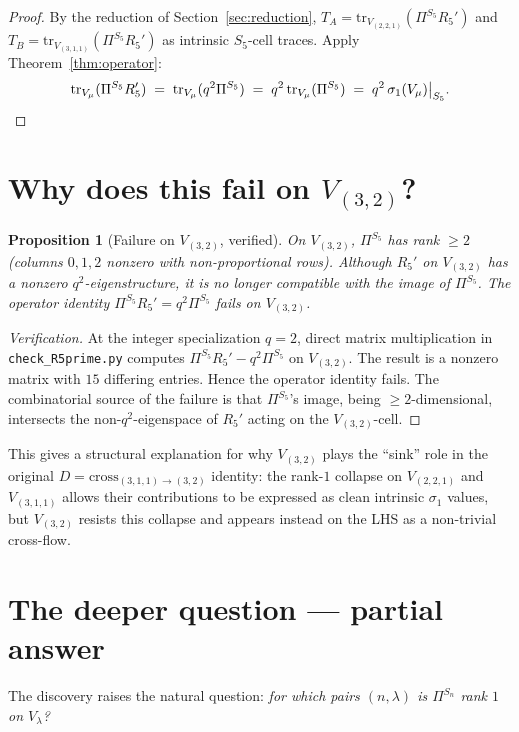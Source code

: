 \documentclass[11pt]{article}
\newtheorem{proposition}[theorem]{Proposition}
\theoremstyle{definition}
\begin{document}
\begin{proof}
By the reduction of Section~\ref{sec:reduction}, $T_A = \mathrm{tr}_{V_{(2,2,1)}}(\Pi^{S_5} R_5')$ and $T_B = \mathrm{tr}_{V_{(3,1,1)}}(\Pi^{S_5} R_5')$ as intrinsic $S_5$-cell traces. Apply Theorem~\ref{thm:operator}:
\[
\mathrm{tr}_{V_\mu}(\Pi^{S_5} R_5') \;=\; \mathrm{tr}_{V_\mu}(q^2 \Pi^{S_5}) \;=\; q^2\, \mathrm{tr}_{V_\mu}(\Pi^{S_5}) \;=\; q^2\, \sigma_1(V_\mu)\big|_{S_5}. \qedhere
\]
\end{proof}

\section{Why does this fail on $V_{(3,2)}$?}\label{sec:32-fail}

\begin{proposition}[Failure on $V_{(3,2)}$, verified]\label{prop:32-fail}
On $V_{(3,2)}$, $\Pi^{S_5}$ has rank $\geq 2$ (columns $0,1,2$ nonzero with non-proportional rows). Although $R_5'$ on $V_{(3,2)}$ has a nonzero $q^2$-eigenstructure, it is no longer compatible with the image of $\Pi^{S_5}$. The operator identity $\Pi^{S_5} R_5' = q^2 \Pi^{S_5}$ fails on $V_{(3,2)}$.
\end{proposition}

\begin{proof}[Verification]
At the integer specialization $q = 2$, direct matrix multiplication in \texttt{check\_R5prime.py} computes $\Pi^{S_5} R_5' - q^2 \Pi^{S_5}$ on $V_{(3,2)}$. The result is a nonzero matrix with $15$ differing entries. Hence the operator identity fails. The combinatorial source of the failure is that $\Pi^{S_5}$'s image, being $\geq 2$-dimensional, intersects the non-$q^2$-eigenspace of $R_5'$ acting on the $V_{(3,2)}$-cell.
\end{proof}

This gives a structural explanation for why $V_{(3,2)}$ plays the ``sink'' role in the original $D = \mathrm{cross}_{(3,1,1)\to(3,2)}$ identity: the rank-$1$ collapse on $V_{(2,2,1)}$ and $V_{(3,1,1)}$ allows their contributions to be expressed as clean intrinsic $\sigma_1$ values, but $V_{(3,2)}$ resists this collapse and appears instead on the LHS as a non-trivial cross-flow.

\section{The deeper question — partial answer}\label{sec:deeper}

The discovery raises the natural question: \emph{for which pairs $(n, \lambda)$ is $\Pi^{S_n}$ rank $1$ on $V_\lambda$?}
\end{document}
